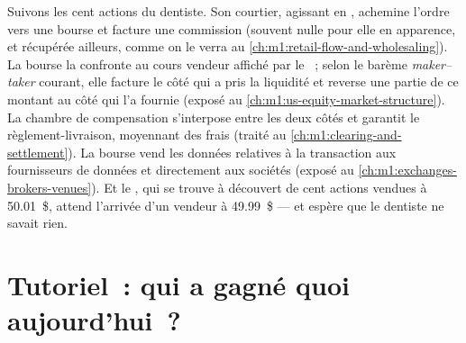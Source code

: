 Suivons les cent actions du dentiste. Son courtier, agissant en , achemine
l'ordre vers une bourse et facture une commission (souvent nulle pour elle en apparence, et
récupérée ailleurs, comme on le verra au \cref{ch:m1:retail-flow-and-wholesaling}).
La bourse la confronte au cours vendeur affiché par le ~; selon le
barème \emph{maker--taker} courant, elle facture le côté qui a pris la liquidité
et reverse une partie de ce montant au côté qui l'a fournie
(exposé au \cref{ch:m1:us-equity-market-structure}). La chambre de compensation s'interpose entre
les deux côtés et garantit le règlement-livraison, moyennant des frais
(traité au \cref{ch:m1:clearing-and-settlement}). La bourse vend les données relatives à la
transaction aux fournisseurs de données et directement aux sociétés
(exposé au \cref{ch:m1:exchanges-brokers-venues}). Et le , qui se trouve à découvert
de cent actions vendues à 50.01~\$, attend l'arrivée d'un vendeur à 49.99~\$ ---
et espère que le dentiste ne savait rien.

\section{Tutoriel~: qui a gagné quoi aujourd'hui~?}\label{tut:m1:what-a-trading-firm-does:whoearns}

